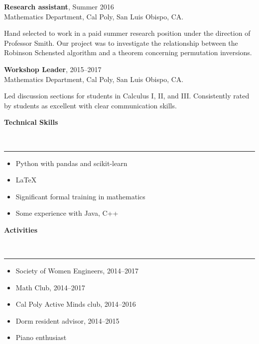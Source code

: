 \documentclass{article}
\newcommand{\sectionrule}[1]{\bigskip \smallskip
{\color{green} \begin{large} \textbf{#1} \end{large}} \\[-1.5ex]
{\color{gold} \rule{.8\textwidth}{.1mm}} 
\smallbreak}
\begin{document}
\textbf{Research assistant}, Summer 2016 \\
Mathematics Department, Cal Poly, San Luis Obispo, CA. 

\smallskip

Hand selected to work in a paid summer research position under the direction of Professor Smith.
Our project was to investigate the relationship between the Robinson Schensted algorithm and
a theorem concerning permutation inversions. 

\bigskip

\textbf{Workshop Leader}, 2015--2017 \\
Mathematics Department, Cal Poly, San Luis Obispo, CA. 

\smallskip

Led discussion sections for students in Calculus I, II, and III.  Consistently rated by students
as excellent with clear communication skills.

\sectionrule{Technical Skills}

\begin{itemize}
\item Python with pandas and scikit-learn 
\item \LaTeX{}
\item Significant formal training in mathematics 
\item Some experience with Java, C++ 
\end{itemize}

\sectionrule{Activities} 

\begin{itemize}
\item Society of Women Engineers, 2014--2017
\item Math Club, 2014--2017
\item Cal Poly Active Minds club, 2014--2016
\item Dorm resident advisor, 2014--2015
\item Piano enthusiast
\end{itemize}
\end{document}
